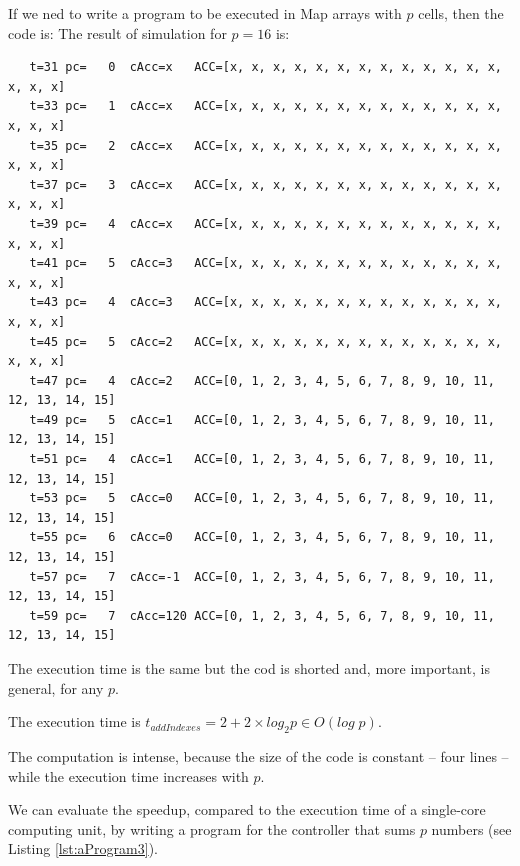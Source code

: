 \begin{exemplu}
If we ned to write a program to be executed in Map arrays with $p$ cells, then the code is:
{\em 
{}
}
The result of simulation for $p=16$ is:
{\small
\begin{verbatim}
   t=31 pc=   0  cAcc=x   ACC=[x, x, x, x, x, x, x, x, x, x, x, x, x, x, x, x] 
   t=33 pc=   1  cAcc=x   ACC=[x, x, x, x, x, x, x, x, x, x, x, x, x, x, x, x] 
   t=35 pc=   2  cAcc=x   ACC=[x, x, x, x, x, x, x, x, x, x, x, x, x, x, x, x] 
   t=37 pc=   3  cAcc=x   ACC=[x, x, x, x, x, x, x, x, x, x, x, x, x, x, x, x] 
   t=39 pc=   4  cAcc=x   ACC=[x, x, x, x, x, x, x, x, x, x, x, x, x, x, x, x] 
   t=41 pc=   5  cAcc=3   ACC=[x, x, x, x, x, x, x, x, x, x, x, x, x, x, x, x] 
   t=43 pc=   4  cAcc=3   ACC=[x, x, x, x, x, x, x, x, x, x, x, x, x, x, x, x] 
   t=45 pc=   5  cAcc=2   ACC=[x, x, x, x, x, x, x, x, x, x, x, x, x, x, x, x] 
   t=47 pc=   4  cAcc=2   ACC=[0, 1, 2, 3, 4, 5, 6, 7, 8, 9, 10, 11, 12, 13, 14, 15] 
   t=49 pc=   5  cAcc=1   ACC=[0, 1, 2, 3, 4, 5, 6, 7, 8, 9, 10, 11, 12, 13, 14, 15] 
   t=51 pc=   4  cAcc=1   ACC=[0, 1, 2, 3, 4, 5, 6, 7, 8, 9, 10, 11, 12, 13, 14, 15] 
   t=53 pc=   5  cAcc=0   ACC=[0, 1, 2, 3, 4, 5, 6, 7, 8, 9, 10, 11, 12, 13, 14, 15] 
   t=55 pc=   6  cAcc=0   ACC=[0, 1, 2, 3, 4, 5, 6, 7, 8, 9, 10, 11, 12, 13, 14, 15] 
   t=57 pc=   7  cAcc=-1  ACC=[0, 1, 2, 3, 4, 5, 6, 7, 8, 9, 10, 11, 12, 13, 14, 15] 
   t=59 pc=   7  cAcc=120 ACC=[0, 1, 2, 3, 4, 5, 6, 7, 8, 9, 10, 11, 12, 13, 14, 15]
\end{verbatim}
}
The execution time is the same but the cod is shorted and, more important, is general, for any $p$.

The execution time is $t_{addIndexes} = 2 + 2 \times log_2 p \in O(log \; p)$.

The computation is intense, because the size of the code is constant -- four lines -- while the execution time increases with $p$.

We can evaluate the speedup, compared to the execution time of a single-core computing unit, by writing a program for the controller that sums $p$ numbers (see Listing \ref{lst:aProgram3}).


\end{exemplu}
